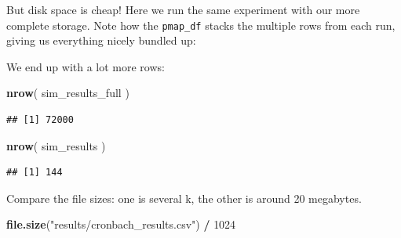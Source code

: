 \documentclass[
]{book}
\newenvironment{Shaded}{\begin{snugshade}}{\end{snugshade}}
\newcommand{\AttributeTok}[1]{\textcolor[rgb]{0.13,0.29,0.53}{#1}}
\newcommand{\DecValTok}[1]{\textcolor[rgb]{0.00,0.00,0.81}{#1}}
\newcommand{\FunctionTok}[1]{\textcolor[rgb]{0.13,0.29,0.53}{\textbf{#1}}}
\newcommand{\NormalTok}[1]{#1}
\newcommand{\OtherTok}[1]{\textcolor[rgb]{0.56,0.35,0.01}{#1}}
\newcommand{\SpecialCharTok}[1]{\textcolor[rgb]{0.81,0.36,0.00}{\textbf{#1}}}
\newcommand{\StringTok}[1]{\textcolor[rgb]{0.31,0.60,0.02}{#1}}
\begin{document}
But disk space is cheap!
Here we run the same experiment with our more
complete storage. Note how the \texttt{pmap\_df} stacks the
multiple rows from each run, giving us everything nicely bundled up:

\begin{Shaded}
\end{Shaded}

We end up with a lot more rows:

\begin{Shaded}
\begin{Highlighting}[]
\FunctionTok{nrow}\NormalTok{( sim\_results\_full )}
\end{Highlighting}
\end{Shaded}

\begin{verbatim}
## [1] 72000
\end{verbatim}

\begin{Shaded}
\begin{Highlighting}[]
\FunctionTok{nrow}\NormalTok{( sim\_results )}
\end{Highlighting}
\end{Shaded}

\begin{verbatim}
## [1] 144
\end{verbatim}

Compare the file sizes: one is several k, the other is around 20 megabytes.

\begin{Shaded}
\begin{Highlighting}[]
\FunctionTok{file.size}\NormalTok{(}\StringTok{"results/cronbach\_results.csv"}\NormalTok{) }\SpecialCharTok{/} \DecValTok{1024}
\end{Highlighting}
\end{Shaded}
\end{document}
